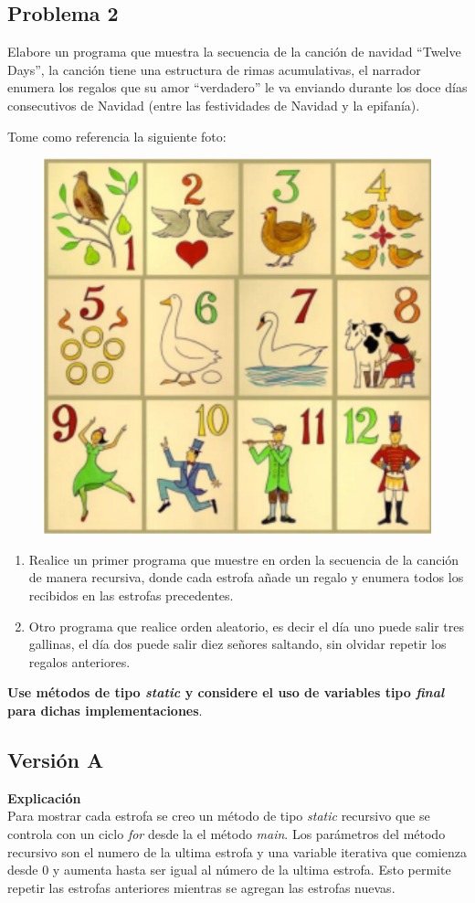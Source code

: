\documentclass[11pt, twocolumn]{article}
\begin{document}
  \subsection*{Problema 2}
  Elabore un programa que muestra la secuencia de la canción de navidad ``Twelve Days'', la canción tiene una estructura de rimas acumulativas, el narrador enumera los regalos que su amor ``verdadero'' le va enviando durante los doce días consecutivos de Navidad (entre las festividades de Navidad y la epifanía).

  Tome como referencia la siguiente foto:
  \begin{figure}[ht]
    \includegraphics[width=0.6\columnwidth, center]{Cancion.png}
  \end{figure}

  \begin{enumerate}[label=\alph*)]
    \item Realice un primer programa que muestre en orden la secuencia de la canción de manera recursiva, donde cada estrofa añade un regalo y enumera todos los recibidos en las estrofas precedentes.
    \item Otro programa que realice orden aleatorio, es decir el día uno puede salir tres gallinas, el día dos puede salir diez señores saltando, sin olvidar repetir los regalos anteriores.
  \end{enumerate}

  \textbf{Use métodos de tipo \textit{static} y considere el uso de variables tipo \textit{final} para dichas implementaciones}.

  \subsection*{Versión A}

  \textbf{Explicación} \\
  Para mostrar cada estrofa se creo un método de tipo \textit{static} recursivo que se controla con un ciclo \textit{for} desde la el método \textit{main}. Los parámetros del método recursivo son el numero de la ultima estrofa y una variable iterativa que comienza desde $0$ y aumenta hasta ser igual al número de la ultima estrofa. Esto permite repetir las estrofas anteriores mientras se agregan las estrofas nuevas. 
\end{document}
